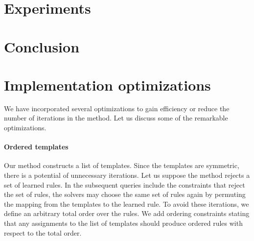 \documentclass{llncs}
\begin{document}
\section{Experiments}
\label{sec:experiments}


% 

\section{Conclusion}
\label{sec:conclusion}





\appendix

\section{Implementation optimizations}

We have incorporated several optimizations to gain efficiency or reduce
the number of iterations in the method. Let us discuss some of the remarkable
optimizations.

\paragraph{Ordered templates}
Our method constructs a list of templates.
Since the templates are symmetric, there is a potential of unnecessary
iterations.
Let us suppose the method rejects a set of learned rules.
In the subsequent queries include the constraints that reject the set of rules,
the solvers may choose the same set of rules again by permuting the mapping
from the templates to the learned rule.
To avoid these iterations, we define an arbitrary total order over the rules.
We add ordering constraints stating that any assignments to the list of templates should produce
ordered rules with respect to the total order.
\end{document}
